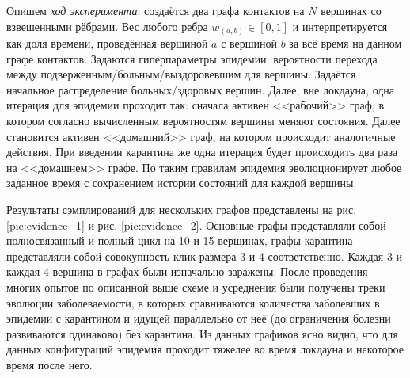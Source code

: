 	Опишем \textit{ход эксперимента}: создаётся два графа контактов на $ N $ вершинах со взвешенными рёбрами. Вес любого ребра $ w_{(a, b)} \in [0, 1] $ и интерпретируется как доля времени, проведённая вершиной $ a $ с вершиной $ b $ за всё время на данном графе контактов. Задаются гиперпараметры эпидемии: вероятности перехода между подверженным/больным/выздоровевшим для вершины. Задаётся начальное распределение больных/здоровых вершин. Далее, вне локдауна, одна итерация для эпидемии проходит так: сначала активен <<рабочий>> граф, в котором согласно вычисленным вероятностям вершины меняют состояния. Далее становится активен <<домашний>> граф, на котором происходит аналогичные действия. При введении карантина же одна итерация будет происходить два раза на <<домашнем>> графе. По таким правилам эпидемия эволюционирует любое заданное время с сохранением истории состояний для каждой вершины.
	
	Результаты сэмплирований для нескольких графов представлены на рис. \ref{pic:evidence_1} и рис. \ref{pic:evidence_2}. Основные графы представляли собой полносвязанный и полный цикл на 10 и 15 вершинах, графы карантина представляли собой совокупность клик размера 3 и 4 соответственно. Каждая 3 и каждая 4 вершина в графах были изначально заражены. После проведения многих опытов по описанной выше схеме и усреднения были получены треки эволюции заболеваемости, в которых сравниваются количества заболевших в эпидемии с карантином и идущей параллельно от неё (до ограничения болезни развиваются одинаково) без карантина. Из данных графиков ясно видно, что для данных конфигураций эпидемия проходит тяжелее во время локдауна и некоторое время после него.
	
